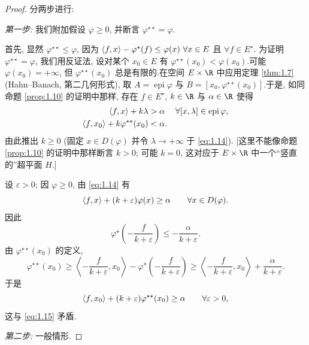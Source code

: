 \begin{proof}
分两步进行:

\emph{第一步:} 我们附加假设 $\varphi\ge 0$, 并断言 $\varphi^{\star\star}=\varphi$.

首先, 显然 $\varphi^{\star\star}\le\varphi$, 因为
$\left\langle f,x\right\rangle-\varphi^\star(f)\le\varphi(x)\ \forall x\in E$ 且 $\forall f\in E^\star$.
为证明 $\varphi^{\star\star}=\varphi$, 我们用反证法, 设对某个 $x_0\in E$ 有
$\varphi^{\star\star}(x_0)<\varphi(x_0)$.可能 $\varphi(x_0)=+\infty$, 但
$\varphi^{\star\star}(x_0)$ 总是有限的.在空间 $E\times\R$ 中应用定理  \ref{thm:1.7}
(Hahn--Banach, 第二几何形式), 取 $A=\operatorname{epi}\varphi$ 与
$B=[x_0,\varphi^{\star\star}(x_0)]$.于是, 如同命题  \ref{prop:1.10} 的证明中那样,
存在 $f\in E^\star$, $k\in\R$ 与 $\alpha\in\R$ 使得
\begin{align}
\left\langle f,x\right\rangle+k\lambda &> \alpha && \forall[x,\lambda]\in\operatorname{epi}\varphi,
  \label{eq:1.14}\\
\left\langle f,x_0\right\rangle+k\varphi^{\star\star}(x_0) &< \alpha.
  \label{eq:1.15}
\end{align}
由此推出 $k\ge 0$ (固定 $x\in D(\varphi)$ 并令 $\lambda\to+\infty$ 于 \eqref{eq:1.14}).
[这里不能像命题  \ref{prop:1.10} 的证明中那样断言 $k>0$; 可能 $k=0$, 这对应于
$E\times\R$ 中一个``竖直的''超平面 $H$.]

设 $\varepsilon>0$; 因 $\varphi\ge 0$, 由 \eqref{eq:1.14} 有
\begin{equation*}
\left\langle f,x\right\rangle+(k+\varepsilon)\varphi(x)\ge\alpha\qquad \forall x\in D(\varphi).
\end{equation*}
因此
\begin{equation*}
\varphi^\star\!\left(-\frac{f}{k+\varepsilon}\right)\le-\frac{\alpha}{k+\varepsilon}.
\end{equation*}
由 $\varphi^{\star\star}(x_0)$ 的定义,
\begin{equation*}
\varphi^{\star\star}(x_0)\ge\left\langle-\frac{f}{k+\varepsilon},x_0\right\rangle
-\varphi^\star\!\left(-\frac{f}{k+\varepsilon}\right)
\ge\left\langle-\frac{f}{k+\varepsilon},x_0\right\rangle+\frac{\alpha}{k+\varepsilon}.
\end{equation*}
于是
\begin{equation*}
\left\langle f,x_0\right\rangle+(k+\varepsilon)\varphi^{\star\star}(x_0)\ge\alpha\qquad \forall\varepsilon>0,
\end{equation*}
这与 \eqref{eq:1.15} 矛盾.

\emph{第二步:} 一般情形.


\end{proof}
